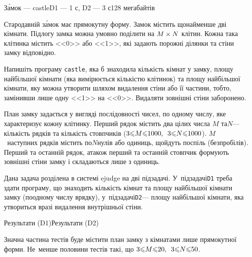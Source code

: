 \documentclass[14pt,a4paper]{extarticle}
\begin{document}
\begin{problem}{З\'{а}мок --- castle}{\stdinOrInputTxt}{\stdoutOrOutputTxt}{D1 --- 1 с, D2 --- 3 с}{128 мегабайтів}


Стародавній з\'{а}мок має прямокутну форму. Замок містить щонайменше дві кімнати. Підлогу замка можна умовно поділити на $M\times N$ клітин. Кожна така клітинка містить <<0>> або <<1>>, які задають порожні ділянки та стіни замку відповідно.

\Task Напишіть програму \texttt{castle}, яка б знаходила кількість кімнат у зам\-ку, площу найбільшої кімнати (яка вимірюється кількістю клітинок) та площу найбільшої кімнати, яку можна утворити шляхом видалення стіни або її частини, тобто, замінивши лише одну <<1>> на <<0>>. Видаляти зовнішні стіни заборонено.

\InputFile План замку задається у вигляді послідовності чисел, по одному числу, яке характеризує кожну клітинку. Перший рядок містить два цілих числа $M$ та\nolinebreak[2] $N$\nolinebreak[3] --- кількість рядків та кількість стовпчиків (${3{\<}M{\<}1000},\hspace{0.5em plus 1em}{3{\<}N{\<}1000}$). $M$~наступних рядків містить по\nolinebreak[3] $N$\nolinebreak[3] нулів або одиниць, що\nolinebreak[3] йдуть поспіль (без\nolinebreak[2] пробілів). Перший та останній рядок, а\nolinebreak[3] також перший та останній стовпчик формують зовнішні стіни замку і складаються лише з одиниць.

\OutputFile Дана задача розділена в системі ejudge на дві підзадачі. У~підзадачі\nolinebreak[3] \texttt{D1} треба здати програму, що знаходить кількість кімнат та площу найбільшої кімнати замку (по\nolinebreak[3] одному числу в\nolinebreak[3] рядку), у~підзадачі\nolinebreak[2] \texttt{D2}\nolinebreak[3] --- площу найбільшої кімнати, яка утвориться в\nolinebreak[3] разі видалення внутрішньої стіни.

\Examples\vspace*{-\baselineskip}

\begin{exampleSimpleThreeWithSpecNameColTwo}{7em}{3em}{3em}{Результати (D1)}{Результати (D2)}%
%
%
\end{exampleSimpleThreeWithSpecNameColTwo}

\Scoring Значна частина тестів буде містити план замку з кімнатами лише прямокутної форми. Не~менше половини тестів такі, що ${3{\<}M{\<}20},\hspace{0.5em plus 1em}{3{\<}N{\<}50}$.

\end{problem}
	
\end{document}
